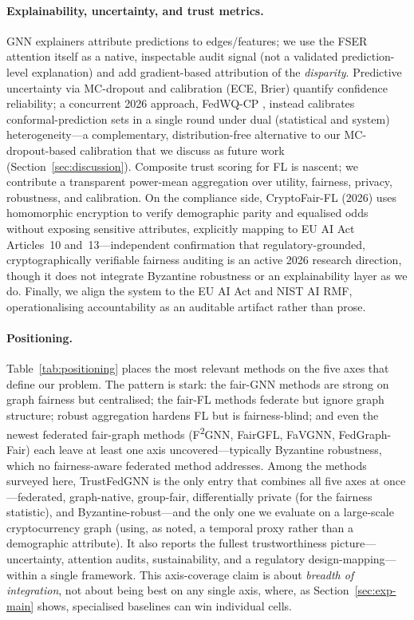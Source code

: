\documentclass[pdflatex,sn-mathphys-num]{sn-jnl}
\theoremstyle{thmstyleone}%
\theoremstyle{thmstyletwo}%
\theoremstyle{thmstylethree}%
\begin{document}
\paragraph{Explainability, uncertainty, and trust metrics.}
GNN explainers attribute predictions to edges/features; we use the FSER
attention itself as a native, inspectable audit signal (not a validated
prediction-level explanation) and add gradient-based attribution of the
\emph{disparity}. Predictive uncertainty via MC-dropout
\cite{gal2016dropout} and calibration (ECE, Brier) quantify confidence
reliability; a concurrent 2026 approach, FedWQ-CP \cite{nguyen2026conformal},
instead calibrates conformal-prediction sets in a single round under dual
(statistical and system) heterogeneity---a complementary, distribution-free
alternative to our MC-dropout-based calibration that we discuss as future work
(Section~\ref{sec:discussion}). Composite trust scoring for FL is nascent; we
contribute a transparent power-mean aggregation over utility, fairness,
privacy, robustness, and calibration. On the compliance side, CryptoFair-FL
\cite{ali2026cryptofair} (2026) uses homomorphic encryption to verify
demographic parity and equalised odds without exposing sensitive attributes,
explicitly mapping to EU AI Act Articles~10 and~13---independent confirmation
that regulatory-grounded, cryptographically verifiable fairness auditing is an
active 2026 research direction, though it does not integrate Byzantine
robustness or an explainability layer as we do. Finally, we align the system
to the EU AI Act and NIST AI RMF, operationalising accountability as an
auditable artifact rather than prose.

\paragraph{Positioning.}
Table~\ref{tab:positioning} places the most relevant methods on the five axes
that define our problem. The pattern is stark: the fair-GNN methods are strong
on graph fairness but centralised; the fair-FL methods federate but ignore graph
structure; robust aggregation hardens FL but is fairness-blind; and even the
newest federated fair-graph methods (F\textsuperscript{2}GNN, FairGFL,
FaVGNN, FedGraph-Fair) each leave at least one axis uncovered---typically
Byzantine robustness, which no fairness-aware federated method addresses.
Among the methods surveyed here, TrustFedGNN is the only entry that combines all
five axes at once---federated, graph-native, group-fair, differentially private
(for the fairness statistic), and Byzantine-robust---and the only one we evaluate
on a large-scale cryptocurrency graph (using, as noted, a temporal proxy rather
than a demographic attribute). It also reports the fullest trustworthiness
picture---uncertainty, attention audits, sustainability, and a regulatory
design-mapping---within a single framework. This axis-coverage claim is about
\emph{breadth of integration}, not about being best on any single axis, where, as
Section~\ref{sec:exp-main} shows, specialised baselines can win individual cells.
\end{document}
